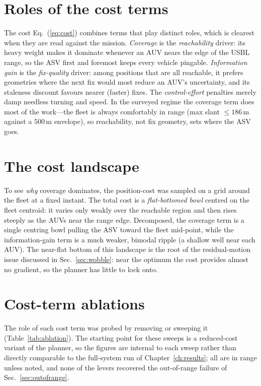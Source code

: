 \documentclass[12pt,a4paper,oneside]{book}
\newcommand{\eqnref}[1]{Eq.~(\ref{#1})}
\newcommand{\tabref}[1]{Table~\ref{#1}}
\newcommand{\secref}[1]{Sec.~\ref{#1}}
\newcommand{\chapref}[1]{Chapter~\ref{#1}}
\begin{document}
\section{Roles of the cost terms}
The cost \eqnref{eq:cost} combines terms that play distinct roles, which is clearest when they are read
against the mission. \emph{Coverage} is the \emph{reachability} driver: its heavy weight makes it dominate
whenever an AUV nears the edge of the USBL range, so the ASV first and foremost keeps every vehicle
pingable. \emph{Information gain} is the \emph{fix-quality} driver: among positions that are all reachable,
it prefers geometries where the next fix would most reduce an AUV's uncertainty, and its staleness discount
favours nearer (faster) fixes. The \emph{control-effort} penalties merely damp needless turning and speed.
In the surveyed regime the coverage term does most of the work---the fleet is always comfortably in range
(max slant $\le186$\,m against a $500$\,m envelope), so reachability, not fix geometry, sets where the ASV
goes.

\section{The cost landscape}
\label{sec:landscape}
To see \emph{why} coverage dominates, the position-cost was sampled on a grid around the fleet at a fixed
instant. The total cost is a \emph{flat-bottomed bowl} centred on the fleet centroid: it varies only weakly
over the reachable region and then rises steeply as the AUVs near the range edge. Decomposed, the coverage
term is a single centring bowl pulling the ASV toward the fleet mid-point, while the information-gain term is
a much weaker, bimodal ripple (a shallow well near each AUV). The near-flat bottom of this landscape is the
root of the residual-motion issue discussed in \secref{sec:wobble}: near the optimum the cost provides
almost no gradient, so the planner has little to lock onto.

\section{Cost-term ablations}
\label{sec:ablations}
The role of each cost term was probed by removing or sweeping it (\tabref{tab:ablation}). The starting point
for these sweeps is a reduced-cost variant of the planner, so the figures are internal to each sweep rather
than directly comparable to the full-system run of \chapref{ch:results}; all are in range unless noted, and
none of the levers recovered the out-of-range failure of \secref{sec:outofrange}.
\end{document}
